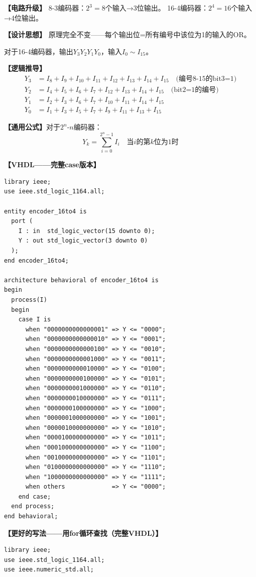 \begin{detailbox}[完整教学]
\textbf{【电路升级】}
8-3编码器：$2^3=8$个输入→3位输出。
16-4编码器：$2^4=16$个输入→4位输出。

\textbf{【设计思想】}
原理完全不变——每个输出位=所有编号中该位为1的输入的OR。

对于16-4编码器，输出$Y_3Y_2Y_1Y_0$，输入$I_0\sim I_{15}$。

\textbf{【逻辑推导】}
\begin{align}
Y_3 &= I_8+I_9+I_{10}+I_{11}+I_{12}+I_{13}+I_{14}+I_{15} \quad\text{(编号8-15的bit3=1)}\\
Y_2 &= I_4+I_5+I_6+I_7+I_{12}+I_{13}+I_{14}+I_{15} \quad\text{(bit2=1的编号)}\\
Y_1 &= I_2+I_3+I_6+I_7+I_{10}+I_{11}+I_{14}+I_{15}\\
Y_0 &= I_1+I_3+I_5+I_7+I_9+I_{11}+I_{13}+I_{15}
\end{align}

\textbf{【通用公式】}对于$2^n$-$n$编码器：
$$Y_k = \sum_{i=0}^{2^n-1} I_i \quad\text{当} i \text{的第}k\text{位为1时}$$

\textbf{【VHDL——完整case版本】}
\begin{lstlisting}[caption={16-4编码器VHDL实现（case版本）}]
library ieee;
use ieee.std_logic_1164.all;

entity encoder_16to4 is
  port (
    I : in  std_logic_vector(15 downto 0);
    Y : out std_logic_vector(3 downto 0)
  );
end encoder_16to4;

architecture behavioral of encoder_16to4 is
begin
  process(I)
  begin
    case I is
      when "0000000000000001" => Y <= "0000";
      when "0000000000000010" => Y <= "0001";
      when "0000000000000100" => Y <= "0010";
      when "0000000000001000" => Y <= "0011";
      when "0000000000010000" => Y <= "0100";
      when "0000000000100000" => Y <= "0101";
      when "0000000001000000" => Y <= "0110";
      when "0000000010000000" => Y <= "0111";
      when "0000000100000000" => Y <= "1000";
      when "0000001000000000" => Y <= "1001";
      when "0000010000000000" => Y <= "1010";
      when "0000100000000000" => Y <= "1011";
      when "0001000000000000" => Y <= "1100";
      when "0010000000000000" => Y <= "1101";
      when "0100000000000000" => Y <= "1110";
      when "1000000000000000" => Y <= "1111";
      when others             => Y <= "0000";
    end case;
  end process;
end behavioral;
\end{lstlisting}

\textbf{【更好的写法——用for循环查找（完整VHDL）】}
\begin{lstlisting}[caption={16-4编码器VHDL实现（for循环版本）}]
library ieee;
use ieee.std_logic_1164.all;
use ieee.numeric_std.all;


\end{lstlisting}
\end{detailbox}
